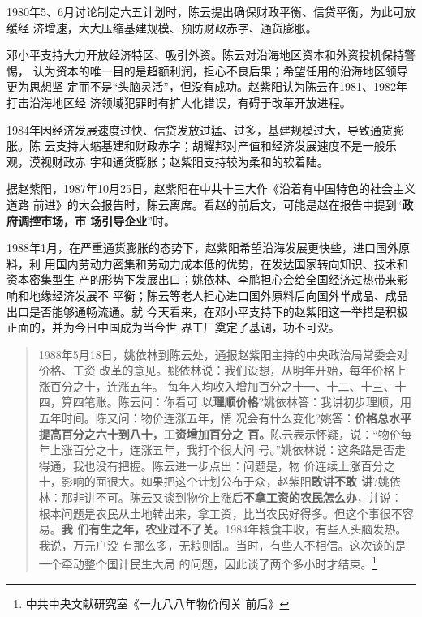 1980年5、6月讨论制定六五计划时，陈云提出确保财政平衡、信贷平衡，为此可放缓经
济增速，大大压缩基建规模、预防财政赤字、通货膨胀。

邓小平支持大力开放经济特区、吸引外资。陈云对沿海地区资本和外资投机保持警惕，
认为资本的唯一目的是超额利润，担心不良后果；希望任用的沿海地区领导更为思想坚
定而不是“头脑灵活”，但没有成功。赵紫阳认为陈云在1981、1982年打击沿海地区经
济领域犯罪时有扩大化错误，有碍于改革开放进程。

1984年因经济发展速度过快、信贷发放过猛、过多，基建规模过大，导致通货膨胀。陈
云支持大缩基建和财政赤字；胡耀邦对产值和经济发展速度不是一般乐观，漠视财政赤
字和通货膨胀；赵紫阳支持较为柔和的软着陆。


据赵紫阳，1987年10月25日，赵紫阳在中共十三大作《沿着有中国特色的社会主义道路
前进》的大会报告时，陈云离席。看赵的前后文，可能是赵在报告中提到“\textbf{政府调控市场，市
  场引导企业}”时。

1988年1月，在严重通货膨胀的态势下，赵紫阳希望沿海发展更快些，进口国外原料，利
用国内劳动力密集和劳动力成本低的优势，在发达国家转向知识、技术和资本密集型生
产的形势下发展出口；姚依林、李鹏担心会给全国经济过热带来影响和地缘经济发展不
平衡；陈云等老人担心进口国外原料后向国外半成品、成品出口是否能够通畅流通。就
今天看来，在邓小平支持下的赵紫阳这一举措是积极正面的，并为今日中国成为当今世
界工厂奠定了基调，功不可没。

\begin{quotation}
  1988年5月18日，姚依林到陈云处，通报赵紫阳主持的中央政治局常委会对价格、工资
  改革的意见。姚依林说：我们设想，从明年开始，每年价格上涨百分之十，连涨五年。
  每年人均收入增加百分之十一、十二、十三、十四，算四笔账。陈云问：你看可
  以\textbf{理顺价格}?姚依林答：我讲初步理顺，用五年时间。陈又问：物价连涨五年，情
  况会有什么变化?姚答：\textbf{价格总水平提高百分之六十到八十，工资增加百分之
    百。}陈云表示怀疑，说：“物价每年上涨百分之十，连涨五年，我打个很大问
  号。”姚依林说：这条路是否走得通，我也没有把握。陈云进一步点出：问题是，物
  价连续上涨百分之十，影响的面很大。如果把这个计划公布于众，赵紫阳\textbf{敢讲不敢
    讲}?姚依林：那非讲不可。陈云又谈到物价上涨后\textbf{不拿工资的农民怎么办}，并说：
  根本问题是农民从土地转出来，拿工资，比当农民好得多。但这个事很不容易。\textbf{我
    们有生之年，农业过不了关。}1984年粮食丰收，有些人头脑发热。我说，万元户没
  有那么多，无粮则乱。当时，有些人不相信。这次谈的是一个牵动整个国计民生大局
  的问题，因此谈了两个多小时才结束。\footnote{中共中央文献研究室《一九八八年物价闯关
    前后》}
\end{quotation}

